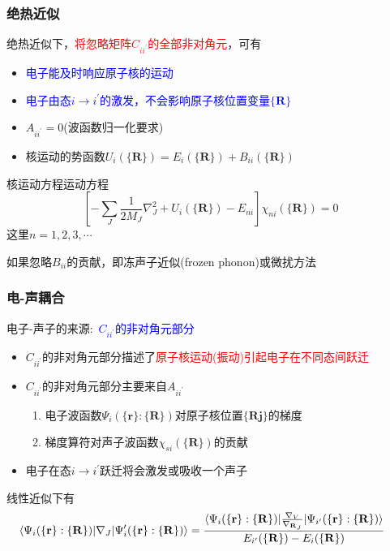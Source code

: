 \documentclass[cjk,slidestop,compress,mathserif,blue]{beamer}
\begin{document}
\frame
{
	\frametitle{绝热近似}
	绝热近似下，\textcolor{red}{将忽略矩阵$C_{ii^{\prime}}$的全部非对角元}，可有
	\begin{itemize}
		\item \textcolor{blue}{电子能及时响应原子核的运动}
		\item \textcolor{blue}{电子由态$i\rightarrow i^{\prime}$的激发，不会影响原子核位置变量${\{\mathbf{R}\}}$}
		\item $A_{ii^{\prime}}=0$(波函数归一化要求)
		\item 核运动的势函数$U_i(\{\mathbf{R}\})=E_i(\{\mathbf{R}\})+B_{ii}(\{\mathbf{R}\})$
	\end{itemize}
	核运动方程运动方程
	\begin{displaymath}
		\left[ -\sum_J\frac1{2M_J}\nabla_J^2+U_i(\{\mathbf{R}\})-E_{ni} \right]\chi_{ni}(\{\mathbf{R}\})=0
	\end{displaymath}
这里$n=1,2,3,\cdots$

如果忽略$B_{ii}$的贡献，即冻声子近似(\textrm{frozen phonon})或微扰方法
}

\frame
{
	\frametitle{电-声耦合}
	电子-声子的来源:~\textcolor{blue}{$C_{ii^{\prime}}$的非对角元部分}
	\begin{itemize}
		\item $C_{ii^{\prime}}$的非对角元部分描述了\textcolor{red}{原子核运动(振动)引起电子在不同态间跃迁}
		\item $C_{ii^{\prime}}$的非对角元部分主要来自$A_{ii^{\prime}}$
			\begin{enumerate}
				\item 电子波函数$\Psi_i(\{\mathbf{r}\}:\{\mathbf{R}\})$对原子核位置$\{\mathbf{Rj}\}$的梯度
				\item 梯度算符对声子波函数$\chi_{si}(\{\mathbf{R}\})$的贡献
			\end{enumerate}
		\item 电子在态$i\rightarrow i^{\prime}$跃迁将会激发或吸收一个声子
	\end{itemize}
	线性近似下有
	\begin{displaymath}
		\hspace*{-15pt}
		\langle\Psi_i(\{\mathbf{r}\}:\{\mathbf{R}\})|\nabla_J|\Psi_i^{\prime}(\{\mathbf{r}\}:\{\mathbf{R}\})\rangle=\frac{\langle\Psi_i(\{\mathbf{r}\}:\{\mathbf{R}\})|\tfrac{\nabla_V}{\nabla_{\mathbf{R}_J}}|\Psi_{i^{\prime}}(\{\mathbf{r}\}:\{\mathbf{R}\})\rangle}{E_{i^{\prime}}(\{\mathbf{R}\})-E_i(\{\mathbf{R}\})}
	\end{displaymath}
}
\end{document}
